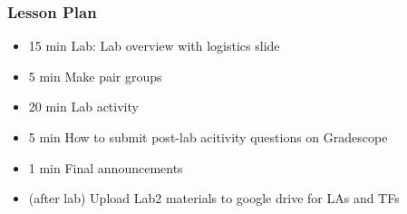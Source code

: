 \begin{frame}
    \frametitle{Lesson Plan}
    \begin{itemize}
        \item 15 min Lab: Lab overview with logistics slide
        \item 5 min Make pair groups
        \item 20 min Lab activity
        \item 5 min How to submit post-lab acitivity questions on Gradescope
        \item 1 min Final announcements 
        \item (after lab) Upload Lab2 materials to google drive for LAs and TFs
    \end{itemize}
\end{frame}
    
